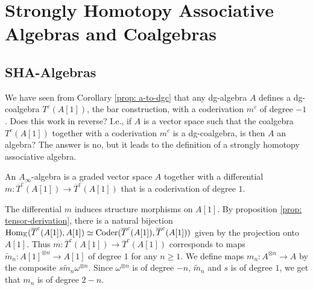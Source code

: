 \documentclass[../thesis.tex]{subfiles}
\begin{document}

    \section{Strongly Homotopy Associative Algebras and Coalgebras}\label{sec: 1.3}
    \subsection{SHA-Algebras}
        We have seen from Corollary \ref{prop: a-to-dgc} that any dg-algebra $A$ defines a dg-coalgebra $T^c(A[1])$, the bar construction, with a coderivation $m^c$ of degree $-1$. Does this work in reverse? I.e., if $A$ is a vector space such that the coalgebra $T^c(A[1])$ together with a coderivation $m^c$ is a dg-coalgebra, is then $A$ an algebra? The answer is no, but it leads to the definition of a strongly homotopy associative algebra.

        \begin{definition}
            An $A_\infty$-algebra is a graded vector space $A$ together with a differential $m:\overline{T}^c(A[1])\rightarrow\overline{T}^c(A[1])$ that is a coderivation of degree $1$.
        \end{definition}

        The differential $m$ induces structure morphisms on $A[1]$. By proposition \ref{prop: tensor-derivation}, there is a natural bijection $\tt{Hom}_\mathbb{K}(\overline{T}^c(A[1]),A[1])\simeq \tt{Coder}(\overline{T}^c(A[1]),\overline{T}^c(A[1]))$ given by the projection onto $A[1]$. Thus $m:\overline{T}^c(A[1])\rightarrow\overline{T}^c(A[1])$ corresponds to maps $\widetilde{m}_n:A[1]^{\otimes n}\rightarrow A[1]$ of degree $1$ for any $n\geq 1$. We define maps $m_n : A^{\otimes n}\rightarrow A$ by the composite $s\widetilde{m}_n \omega^{\otimes n}$. Since $\omega^{\otimes n}$ is of degree $-n$, $\widetilde{m}_n$ and $s$ is of degree $1$, we get that $m_n$ is of degree $2-n$.
        \begin{center}
        \end{center}
\end{document}
